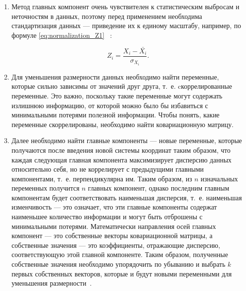 \begin{enumerate}[label=\arabic*.]
	\item Метод главных компонент очень чувствителен к статистическим выбросам и неточностям в данных, поэтому перед применением необходима стандартизация данных --- приведение их к единому масштабу, например, по формуле \ref{eq:normalization_Z1} ~\cite{zakaria, polyak}:
	
	\begin{equation}\label{eq:normalization_Z1}
		Z_i = \frac{{X_i - \bar{X_i}}}{{\sigma_{X_i}}}.
	\end{equation}
	\item Для уменьшения размерности данных необходимо найти переменные, которые сильно зависимы от значений друг друга, т.~е. cкоррелированные переменные. Это важно, поскольку такие переменные могут содержать излишнюю информацию, от которой можно было бы избавиться с минимальными потерями полезной информации. Чтобы понять, какие переменные скоррелированы, необходимо найти ковариационную матрицу.
	\item Далее необходимо найти главные компоненты --- новые переменные, которые получаются после введения новой системы координат таким образом, что каждая следующая главная компонента максимизирует дисперсию данных относительно себя, но не коррелирует с предыдущими главными компонентами, т.~е. перпендикулярна им. Таким образом, из $n$ изначальных переменных получится $n$ главных компонент, однако последним главным компонентам будет соответствовать наименьшая дисперсия, т.~е. наименьшая изменчивость --- это означает, что эти главные компоненты содержат наименьшее количество информации и могут быть отброшены с минимальными потерями. Математически направления осей главных компонент --- это собственные векторы ковариационной матрицы, а собственные значения --- это коэффициенты, отражающие дисперсию, соответствующую этой главной компоненте. Таким образом, полученные собственные значения необходимо упорядочить по убыванию и выбрать $k$ первых собственных векторов, которые и будут новыми переменными для уменьшения размерности~\cite{orlov, polyak, zakaria}.
	

\end{enumerate}
